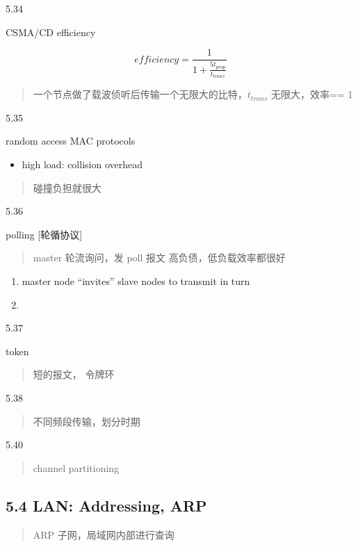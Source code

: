 \documentclass[
]{article}
\begin{document}
5.34

CSMA/CD efficiency

\[efficiency = \frac{1}{1+\frac{5t_{prop}}{t_{trans}}}\]

\begin{quote}
一个节点做了载波侦听后传输一个无限大的比特，\(t_{trans}\) 无限大，效率==
1
\end{quote}

5.35

random access MAC protocols

\begin{itemize}
\item
  high load: collision overhead
\end{itemize}

\begin{quote}
碰撞负担就很大
\end{quote}

5.36

polling {[}轮循协议{]}

\begin{quote}
master 轮流询问，发 poll 报文 高负债，低负载效率都很好
\end{quote}

\begin{enumerate}
\def\labelenumi{\arabic{enumi}.}
\item
  master node ``invites'' slave nodes to transmit in turn
\item
\end{enumerate}

5.37

token

\begin{quote}
短的报文， 令牌环
\end{quote}

5.38

\begin{quote}
不同频段传输，划分时期
\end{quote}

5.40

\begin{quote}
channel partitioning
\end{quote}

\hypertarget{54-lan-addressing-arp}{%
\subsection{5.4 LAN: Addressing, ARP}\label{54-lan-addressing-arp}}

\begin{quote}
ARP 子网，局域网内部进行查询
\end{quote}
\end{document}
